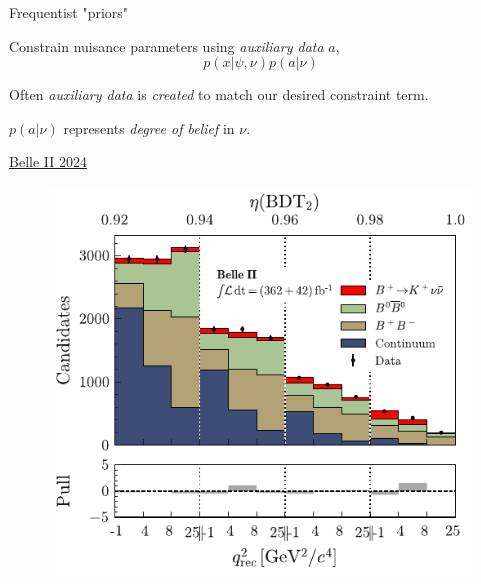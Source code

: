 \documentclass[
aspectratio=169,
14pt,
professionalfonts
]{beamer}
\begin{document}
\begin{frame}{Frequentist "priors"}
    \vspace{-0.5cm}
    \begin{minipage}{0.7\textwidth}
        Constrain nuisance parameters using \textit{auxiliary data} $a$,
        $$p(x| \psi, \nu) p(a| \nu)$$
        
        Often \textit{auxiliary data} is \textit{created} to match our desired constraint term.

        \vspace{0.5cm}

        $p(a| \nu)$ represents \textit{degree of belief} in $\nu$.

        \flushright \small
        \href{https://arxiv.org/pdf/2311.14647}{Belle II 2024}
    \end{minipage}
    \begin{minipage}{0.29\textwidth}
        \begin{figure}
            \centering
            \includegraphics[width=\textwidth]{../plots/knunu-signal.pdf}

\end{figure}
\end{minipage}
\end{frame}
\end{document}
